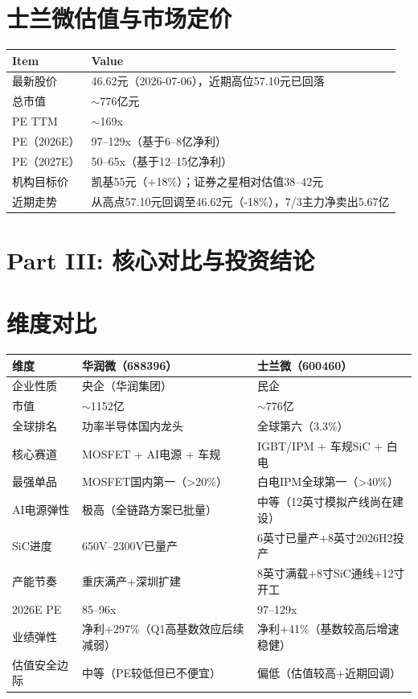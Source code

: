 \documentclass[a4paper,11pt,fontset=none]{ctexart}
\begin{document}
\section{士兰微估值与市场定价}

\begin{tabularx}{\textwidth}{L{3cm}X}
\toprule
\textbf{Item} & \textbf{Value} \\
\midrule
最新股价 & 46.62元（2026-07-06），近期高位57.10元已回落 \\
总市值 & $\sim$776亿元 \\
PE TTM & $\sim$169x \\
PE（2026E） & 97--129x（基于6--8亿净利） \\
PE（2027E） & 50--65x（基于12--15亿净利） \\
机构目标价 & 凯基55元（+18\%）；证券之星相对估值38--42元 \\
近期走势 & 从高点57.10元回调至46.62元（-18\%），7/3主力净卖出5.67亿 \\
\bottomrule
\end{tabularx}

\newpage
\section*{\color{navy}\large Part III: 核心对比与投资结论}

\section{维度对比}

\begin{tabularx}{\textwidth}{L{2.5cm}XX}
\toprule
\textbf{维度} & \textbf{华润微（688396）} & \textbf{士兰微（600460）} \\
\midrule
企业性质 & 央企（华润集团） & 民企 \\
市值 & $\sim$1152亿 & $\sim$776亿 \\
全球排名 & 功率半导体国内龙头 & 全球第六（3.3\%） \\
核心赛道 & MOSFET + AI电源 + 车规 & IGBT/IPM + 车规SiC + 白电 \\
最强单品 & MOSFET国内第一（>20\%） & 白电IPM全球第一（>40\%） \\
AI电源弹性 & 极高（全链路方案已批量） & 中等（12英寸模拟产线尚在建设） \\
SiC进度 & 650V--2300V已量产 & 6英寸已量产+8英寸2026H2投产 \\
产能节奏 & 重庆满产+深圳扩建 & 8英寸满载+8寸SiC通线+12寸开工 \\
2026E PE & 85--96x & 97--129x \\
业绩弹性 & 净利+297\%（Q1高基数效应后续减弱） & 净利+41\%（基数较高后增速稳健） \\
估值安全边际 & 中等（PE较低但已不便宜） & 偏低（估值较高+近期回调） \\
\bottomrule
\end{tabularx}
\end{document}
